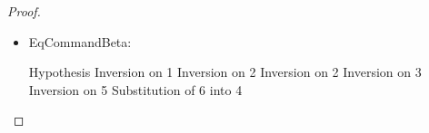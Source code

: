 \begin{proof}
\begin{itemize}
  \begin{eqnproof}[\interpC{\judgeC{\Gamma}{\letv{x}{\comp{c}}{x}}{A}}\;\theta\;\gamma =]
          {Semantics}
          {Semantics}
          {Simplify}
          {Monad law}
          {Simplify}
  \end{eqnproof}

\item EqCommandBeta:

  \begin{eqnproof}
              {Hypothesis}
              {Inversion on 1}
              {Inversion on 2}
              {Inversion on 2}
              {Inversion on 3}
              {Inversion on 5}
              {Substitution of 6 into 4}
  \end{eqnproof}


\end{itemize}
\end{proof}
